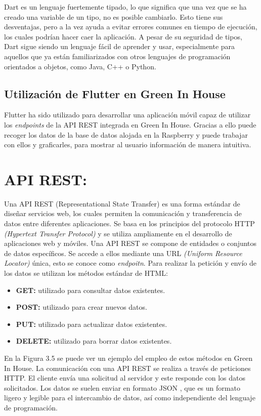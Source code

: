     Dart es un lenguaje fuertemente tipado, lo que significa que una vez que se ha creado una variable de un tipo, no es posible cambiarlo. Esto tiene sus desventajas, pero a la vez ayuda a evitar errores comunes en tiempo de ejecución, los cuales podrían hacer caer la aplicación. A pesar de su seguridad de tipos, Dart sigue siendo un lenguaje fácil de aprender y usar, especialmente para aquellos que ya están familiarizados con otros lenguajes de programación orientados a objetos, como Java, C++ o Python.
    
    \subsection{Utilización de Flutter en Green In House}
    Flutter ha sido utilizado para desarrollar una aplicación móvil capaz de utilizar los \textit{endpoints} de la API REST integrada en Green In House. Gracias a ello puede recoger los datos de la base de datos alojada en la Raspberry y puede trabajar con ellos y graficarles, para mostrar al usuario información de manera intuitiva.

\section{API REST:}
Una API REST \cite{wiki:api_rest} (Representational State Transfer) es una forma estándar de diseñar servicios web, los cuales permiten la comunicación y transferencia de datos entre diferentes aplicaciones. Se basa en los principios del protocolo HTTP \textit{(Hypertext Transfer Protocol)} y se utiliza ampliamente en el desarrollo de aplicaciones web y móviles.
Una API REST se compone de entidades o conjuntos de datos específicos. Se accede a ellos mediante una URL \textit{(Uniform Resource Locator)} única, esto se conoce como \textit{endpoitn}. Para realizar la petición y envío de los datos se utilizan los métodos estándar de HTML:
\begin{itemize}
    \item \textbf{GET:} utilizado para consultar datos existentes.
    \item \textbf{POST:} utilizado para crear nuevos datos.
    \item \textbf{PUT:} utilizado para actualizar datos existentes.
    \item \textbf{DELETE:} utilizado para borrar datos existentes.
\end{itemize}
En la Figura 3.5 se puede ver un ejemplo del empleo de estos métodos en Green In House. La comunicación con una API REST se realiza a través de peticiones HTTP. El cliente envía una solicitud al servidor y este responde con los datos solicitados. Los datos se suelen enviar en formato JSON , que es un formato ligero y legible para el intercambio de datos, así como independiente del lenguaje de programación.


